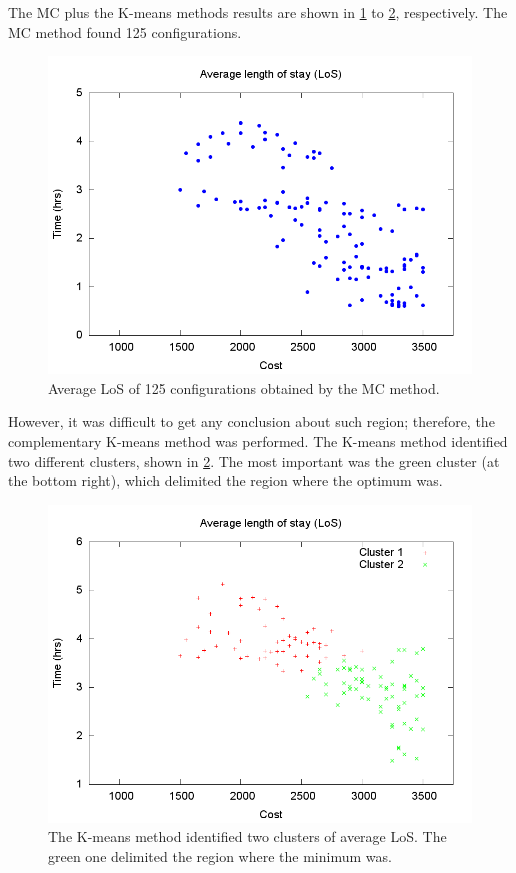 The MC plus the K-means methods results are shown in \ref{subfig:mc13-1}
to \ref{subfig:km13-1}, respectively. The MC method found 125 configurations.
\begin{figure}[H]
\noindent \centering{}\includegraphics[width=0.95\columnwidth,height=0.25\paperheight]{figs4/v0/MC/MC-6400-602-50-69-25-125confs-LoS}\caption{Average LoS of 125 configurations obtained by the MC method. \label{subfig:mc13-1}}
\end{figure}
 However, it was difficult to get any conclusion about such region;
therefore, the complementary K-means method was performed. The K-means
method identified two different clusters, shown in \ref{subfig:km13-1}.
The most important was the green cluster (at the bottom right), which
delimited the region where the optimum was.
\begin{figure}[H]
\noindent \centering{}\includegraphics[width=0.95\columnwidth,height=0.25\paperheight]{figs4/v0/MC/K-means-6400-602-75-69-25-125-Cluster1-54_Cluster2-63}\caption{The K-means method identified two clusters of average LoS. The green
one delimited the region where the minimum was.\label{subfig:km13-1}}
\end{figure}


